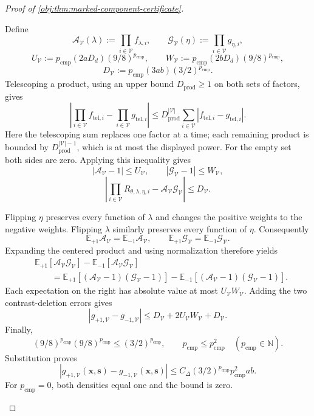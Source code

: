 \begin{proof}[Proof of \cref{obj:thm:marked-component-certificate}]
\begin{enumerate}
Define
\[
\mathcal A_{\mathcal V}(\lambda)
:=\prod_{i\in\mathcal V}f_{\lambda,i},
\qquad
\mathcal G_{\mathcal V}(\eta)
:=\prod_{i\in\mathcal V}g_{\eta,i},
\]
\[
U_{\mathcal V}
:=p_{\mathrm{cmp}}(2aD_d)(9/8)^{p_{\mathrm{cmp}}},
\qquad
W_{\mathcal V}
:=p_{\mathrm{cmp}}(2bD_d)(9/8)^{p_{\mathrm{cmp}}},
\]
\[
D_{\mathcal V}
:=p_{\mathrm{cmp}}(3ab)(3/2)^{p_{\mathrm{cmp}}}.
\]
Telescoping a product, using an upper bound \(D_{\mathrm{prod}}\ge1\) on both sets of factors, gives
\[
\left|
\prod_{i\in\mathcal V}f_{\mathrm{tel},i}
-\prod_{i\in\mathcal V}g_{\mathrm{tel},i}
\right|
\le
D_{\mathrm{prod}}^{|\mathcal V|}
\sum_{i\in\mathcal V}
|f_{\mathrm{tel},i}-g_{\mathrm{tel},i}|.
\]
Here the telescoping sum replaces one factor at a time; each remaining product is bounded by \(D_{\mathrm{prod}}^{|\mathcal V|-1}\), which is at most the displayed power. For the empty set both sides are zero. Applying this inequality gives
\[
|\mathcal A_{\mathcal V}-1|\le U_{\mathcal V},
\qquad
|\mathcal G_{\mathcal V}-1|\le W_{\mathcal V},
\]
\[
\left|
\prod_{i\in\mathcal V}R_{\theta,\lambda,\eta,i}
-\mathcal A_{\mathcal V}\mathcal G_{\mathcal V}
\right|
\le D_{\mathcal V}.
\]

Flipping \(\eta\) preserves every function of \(\lambda\) and changes the positive weights to the negative weights. Flipping \(\lambda\) similarly preserves every function of \(\eta\). Consequently
\[
\mathbb E_{+1}\mathcal A_{\mathcal V}
=\mathbb E_{-1}\mathcal A_{\mathcal V},
\qquad
\mathbb E_{+1}\mathcal G_{\mathcal V}
=\mathbb E_{-1}\mathcal G_{\mathcal V}.
\]
Expanding the centered product and using normalization therefore yields
\[
\begin{aligned}
&\mathbb E_{+1}[\mathcal A_{\mathcal V}\mathcal G_{\mathcal V}]
-\mathbb E_{-1}[\mathcal A_{\mathcal V}\mathcal G_{\mathcal V}]\\
&\qquad=
\mathbb E_{+1}[(\mathcal A_{\mathcal V}-1)(\mathcal G_{\mathcal V}-1)]
-\mathbb E_{-1}[(\mathcal A_{\mathcal V}-1)(\mathcal G_{\mathcal V}-1)].
\end{aligned}
\]
Each expectation on the right has absolute value at most
\(U_{\mathcal V}W_{\mathcal V}\). Adding the two contrast-deletion errors gives
\[
|g_{+1,\mathcal V}-g_{-1,\mathcal V}|
\le D_{\mathcal V}+2U_{\mathcal V}W_{\mathcal V}+D_{\mathcal V}.
\]
Finally,
\[
(9/8)^{p_{\mathrm{cmp}}}(9/8)^{p_{\mathrm{cmp}}}
\le(3/2)^{p_{\mathrm{cmp}}},
\qquad
p_{\mathrm{cmp}}\le p_{\mathrm{cmp}}^2
\quad(p_{\mathrm{cmp}}\in\mathbb N).
\]
Substitution proves
\[
|g_{+1,\mathcal V}(\mathbf x,\mathbf s)
-g_{-1,\mathcal V}(\mathbf x,\mathbf s)|
\le
C_\Delta(3/2)^{p_{\mathrm{cmp}}}
p_{\mathrm{cmp}}^2ab.
\]
For \(p_{\mathrm{cmp}}=0\), both densities equal one and the bound is zero.


\end{enumerate}
\end{proof}
